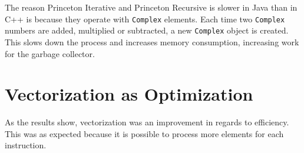 The reason Princeton Iterative and Princeton Recursive is slower in Java than in C++ is because they operate with \texttt{Complex} elements. Each time two \texttt{Complex} numbers are added, multiplied or subtracted, a new \texttt{Complex} object is created. This slows down the process and increases memory consumption, increasing work for the garbage collector.






\section{Vectorization as Optimization}

As the results show, vectorization was an improvement in regards to efficiency. This was as expected because it is possible to process more elements for each instruction. 









% 

% 
